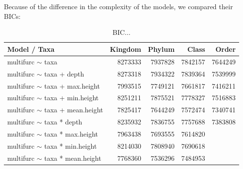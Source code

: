         \\ \\

        Because of the difference in the complexity of the models, we compared their BICs:
        \begin{table}[h]
          \begin{center}
            \begin{tabular}{ |l|r|r|r|r| }
              \hline
              Model / Taxa & Kingdom & Phylum & Class & Order \\
              \hline \hline
              multifurc $\sim$ taxa & 8273333 & 7937828 & 7842157 & 7644249\\
              \hline
              multifurc $\sim$ taxa + depth & 8273318 & 7934322 & 7839364 & \cellcolor{green!50}7539999 \\
              multifurc $\sim$ taxa + max.height & 7993515 & 7749121 & 7661817 & \cellcolor{green!50}7416211 \\
              multifurc $\sim$ taxa + min.height & 8251211 & 7875521  & 7778327 & \cellcolor{green!50}7516883 \\
              multifurc $\sim$ taxa + mean.height & 7825417 & 7644249 & \cellcolor{green!50}7572474 & \cellcolor{green!50}7340741 \\
              \hline
              multifurc $\sim$ taxa * depth & 8235932 & 7836755 & 7757688 & \cellcolor{green!50}7383808 \\
              multifurc $\sim$ taxa * max.height & 7963438 & 7693555 & 7614820 & \\
              multifurc $\sim$ taxa * min.height & 8214030 & 7808940 & 7690618 & \\
              multifurc $\sim$ taxa * mean.height & 7768360 & \cellcolor{green!50}7536296 & \cellcolor{green!50}7484953 & \\
              \hline
            \end{tabular} 
          \end{center}
          \caption{BIC...}
          \label{table:...} 
        \end{table}

